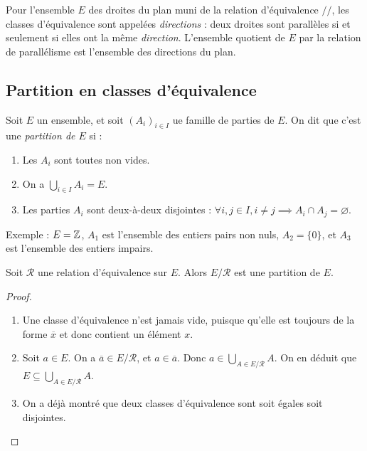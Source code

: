 \begin{exemple}Pour l'ensemble $E$ des droites du plan muni de la relation d'équivalence $//$, les classes d'équivalence sont appelées \emph{directions} : deux droites sont parallèles si et seulement si elles ont la même \emph{direction}. L'ensemble quotient de $E$ par la relation de parallélisme est l'ensemble des directions du plan.
\end{exemple}

\subsection{Partition en classes d'équivalence}

\begin{definition}
Soit $E$ un ensemble, et soit $(A_i)_{i\in I}$ ue famille de parties de $E$. On dit que c'est une \emph{partition de $E$} si :
\begin{enumerate}
\item Les $A_i$ sont toutes non vides.
\item On a $\bigcup_{i\in I} A_i = E$.
\item Les parties $A_i$ sont deux-à-deux disjointes : $\forall i, j\in I, i\neq j \implies A_i\cap A_j=\varnothing$.
\end{enumerate}
\end{definition}

Exemple : $E = \mathbb{Z}$, $A_1 $ est l'ensemble des entiers pairs non nuls, $A_2=\{0\}$, et $A_3$ est l'ensemble des entiers impairs.

\begin{proposition}
Soit $\mathcal R$ une relation d'équivalence sur $E$. Alors $E/\mathcal R$ est une partition de $E$.
\end{proposition}
\begin{proof}
\begin{enumerate}
\item Une classe d'équivalence n'est jamais vide, puisque qu'elle est toujours de la forme $\overline{x}$ et donc contient un élément $x$.
\item Soit $a\in E$. On a $\overline{a} \in E/\mathcal R$, et $a\in \overline{a}$. Donc $a\in \bigcup_{A\in E/\mathcal R} A$. On en déduit que $E\subseteq \bigcup_{A\in E/\mathcal R} A$.
\item On a déjà montré que deux classes d'équivalence sont soit égales soit disjointes.
\end{enumerate}
\end{proof}

